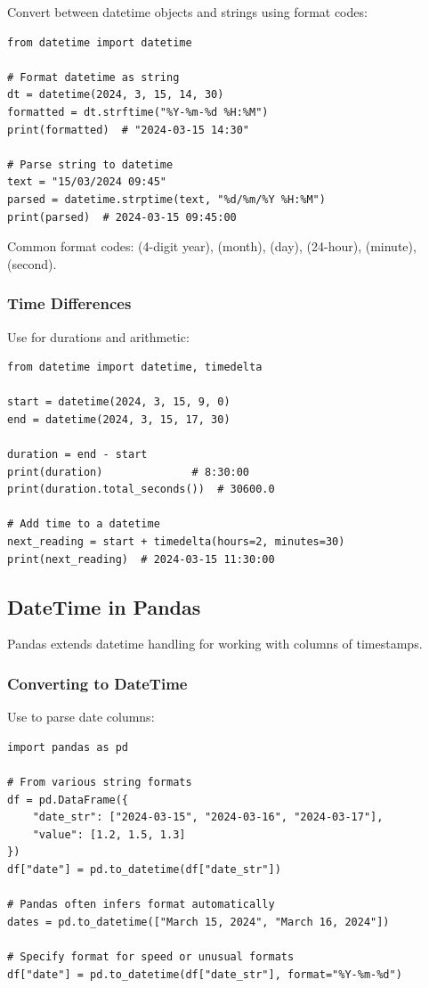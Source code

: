 Convert between datetime objects and strings using format codes:

\begin{lstlisting}
from datetime import datetime

# Format datetime as string
dt = datetime(2024, 3, 15, 14, 30)
formatted = dt.strftime("%Y-%m-%d %H:%M")
print(formatted)  # "2024-03-15 14:30"

# Parse string to datetime
text = "15/03/2024 09:45"
parsed = datetime.strptime(text, "%d/%m/%Y %H:%M")
print(parsed)  # 2024-03-15 09:45:00
\end{lstlisting}

Common format codes:  (4-digit year),  (month),  (day),  (24-hour),  (minute),  (second).

\subsubsection{Time Differences}

Use  for durations and arithmetic:

\begin{lstlisting}
from datetime import datetime, timedelta

start = datetime(2024, 3, 15, 9, 0)
end = datetime(2024, 3, 15, 17, 30)

duration = end - start
print(duration)              # 8:30:00
print(duration.total_seconds())  # 30600.0

# Add time to a datetime
next_reading = start + timedelta(hours=2, minutes=30)
print(next_reading)  # 2024-03-15 11:30:00
\end{lstlisting}

\subsection{DateTime in Pandas}

Pandas extends datetime handling for working with columns of timestamps.

\subsubsection{Converting to DateTime}

Use  to parse date columns:

\begin{lstlisting}
import pandas as pd

# From various string formats
df = pd.DataFrame({
    "date_str": ["2024-03-15", "2024-03-16", "2024-03-17"],
    "value": [1.2, 1.5, 1.3]
})
df["date"] = pd.to_datetime(df["date_str"])

# Pandas often infers format automatically
dates = pd.to_datetime(["March 15, 2024", "March 16, 2024"])

# Specify format for speed or unusual formats
df["date"] = pd.to_datetime(df["date_str"], format="%Y-%m-%d")
\end{lstlisting}

